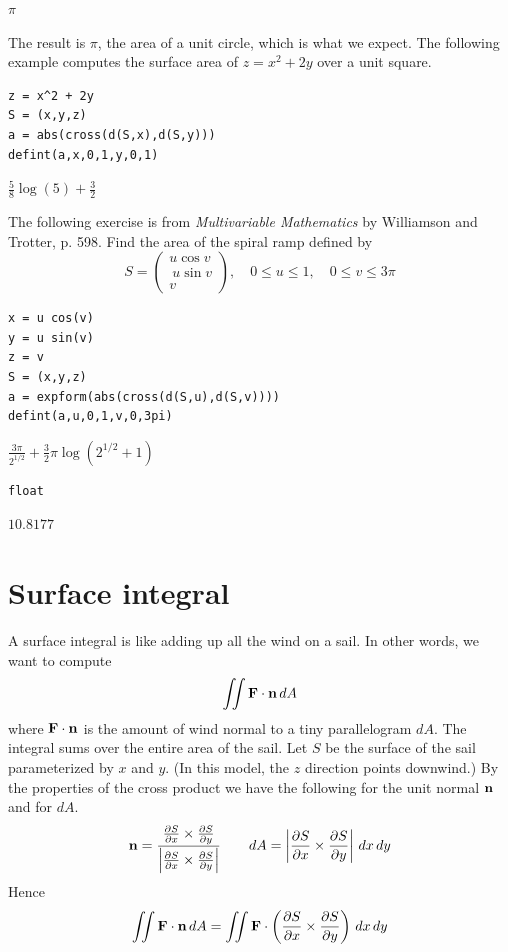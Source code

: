 \documentclass[12pt]{article}
\begin{document}
$\displaystyle \pi$

\bigskip
The result is $\pi$, the area of a unit circle, which is what we expect.
The following example computes the surface area of $z=x^2+2y$ over
a unit square.

{\color{blue}
\begin{verbatim}
z = x^2 + 2y
S = (x,y,z)
a = abs(cross(d(S,x),d(S,y)))
defint(a,x,0,1,y,0,1)
\end{verbatim}
}

$\displaystyle \tfrac{5}{8}\log(5)+\tfrac{3}{2}$

\bigskip
The following exercise is from
{\it Multivariable Mathematics} by Williamson and Trotter, p. 598.
Find the area of the spiral ramp defined by
\begin{equation*}
S=\begin{pmatrix}u\cos v\\\ u\sin v\\ v\end{pmatrix},\quad 0\le u\le1,\quad 0\le v\le3\pi
\end{equation*}

{\color{blue}
\begin{verbatim}
x = u cos(v)
y = u sin(v)
z = v
S = (x,y,z)
a = expform(abs(cross(d(S,u),d(S,v))))
defint(a,u,0,1,v,0,3pi)
\end{verbatim}
}

$\displaystyle \frac{3\pi}{2^{1/2}}+\tfrac{3}{2}\pi\log\left(2^{1/2}+1\right)$

{\color{blue}
\begin{verbatim}
float
\end{verbatim}
}

$\displaystyle 10.8177$

\newpage

\section{Surface integral}

A surface integral is like adding up all the wind on a sail.
In other words, we want to compute
$$\int\!\!\!\int{\bf F\cdot n}\,dA$$
where ${\bf F\cdot n}$ is the amount of wind normal to a tiny parallelogram $dA$.
The integral sums over the entire area of the sail.
Let $S$ be the surface of the sail parameterized by $x$ and $y$.
(In this model, the $z$ direction points downwind.)
By the properties of the cross product we have the following for the unit normal $\bf n$
and for $dA$.
$${\bf n}=\frac{{\frac{\partial S}{\partial x}\times\frac{\partial S}{\partial y}}}
{{\left|\frac{\partial S}{\partial x}\times\frac{\partial S}{\partial y}\right|}}\qquad
dA=\left|\frac{\partial S}{\partial x}\times\frac{\partial S}{\partial y}\right|\,dx\,dy$$
Hence
$$\int\!\!\!\int{\bf F\cdot n}\,dA=\int\!\!\!\int{\bf F}\cdot
\left({\frac{\partial S}{\partial x}\times\frac{\partial S}{\partial y}}\right)\,dx\,dy$$
\end{document}
